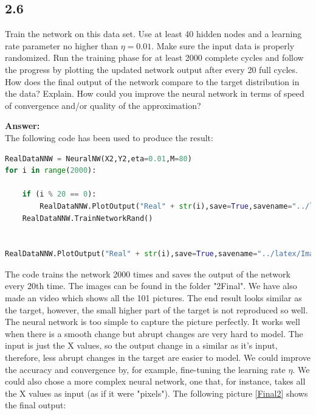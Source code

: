\documentclass[a4paper]{article}
\begin{document}
\subsection*{2.6}

Train the network on this data set. Use at least 40 hidden nodes and a learning rate parameter no higher than $\eta = 0.01$. Make sure the input data is properly randomized. Run the training phase for at least 2000 complete cycles and follow the progress by plotting the updated network output after every 20 full cycles. How does the final output of the network compare to the target distribution in the data? Explain. How could you improve the neural network in terms of speed of convergence and/or quality of the approximation?


\textbf{Answer:}\\


The following code has been used to produce the result:

\begin{lstlisting}[language=Python]
RealDataNNW = NeuralNW(X2,Y2,eta=0.01,M=80)
for i in range(2000):
    
    if (i % 20 == 0):
        RealDataNNW.PlotOutput("Real" + str(i),save=True,savename="../latex/Images/Final2/" + str(i) + ".png",title="Iteration " + str(i))
    RealDataNNW.TrainNetworkRand()


RealDataNNW.PlotOutput("Real" + str(i),save=True,savename="../latex/Images/Final2/" + str(i+1) + ".png",title="Iteration " + str(i+1))
\end{lstlisting}


The code trains the network 2000 times and saves the output of the network every 20th time. 
The images can be found in the folder "2Final". We have also made an video which shows all the 101 pictures.
The end result looks similar as the target, however, the small higher part of the target is not reproduced so well.
The neural network is too simple to capture the picture perfectly. It works well when there is a smooth change but abrupt changes are very hard to model.
The input is just the X values, so the output change in a similar as it's input, therefore, less abrupt changes in the target are easier to model.
We could improve the accuracy and convergence by, for example, fine-tuning the learning rate $\eta$. We could also chose a more complex neural network, one that, for instance, takes all the X values as input (as if it were "pixels"). The following picture \ref{Final2} shows the final output:
\end{document}
